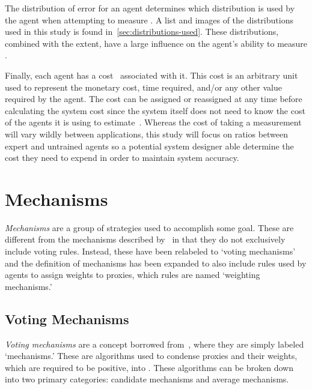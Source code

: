 The distribution of error for an agent determines which distribution is used by the
agent when attempting to measure \truth.
A list and images of the distributions used in this study is found
in~\autoref{sec:distributions-used}.
These distributions, combined with the extent, have a large influence on the
agent's ability to measure \truth.

Finally, each agent has a cost \agentcost\ associated with it.
This cost is an arbitrary unit used to represent the monetary cost, time
required, and/or any other value required by the agent.
The cost can be assigned or reassigned at any time before calculating the
system cost since the system itself does not need to know the cost of the
agents it is using to estimate~\truth.
Whereas the cost of taking a measurement will vary wildly between applications, this
study will focus on ratios between expert and untrained agents so a potential system
designer able determine the cost they need to expend in order to maintain system
accuracy.



\section{Mechanisms}\label{sec:mechanisms}
\textit{Mechanisms} are a group of strategies used to accomplish some goal.
These are different from the mechanisms described by~\cite{Cohensius2017} in
that they do not exclusively include voting rules.
Instead, these have been relabeled to `voting mechanisms' and the definition
of mechanisms has been expanded to also include rules used by agents to
assign weights to proxies, which rules are named `weighting mechanisms.'

\subsection{Voting Mechanisms}\label{subsec:voting-mechanisms}
\textit{Voting mechanisms} are a concept borrowed from~\cite{Cohensius2017},
where they are simply labeled `mechanisms.'
These are algorithms used to condense proxies and their weights, which are
required to be positive, into \systemtruth.
These algorithms can be broken down into two primary categories: candidate
mechanisms and average mechanisms.

